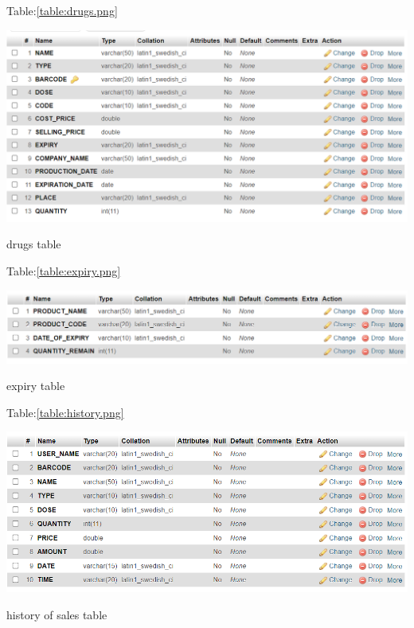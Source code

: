 \documentclass[12pt, letter paper]{report}
\begin{document}
\begin{center}
	Table:\ref{table:drugs.png} 
	\begin{table}[h]
		\centering
		\includegraphics[width=1\textwidth]{drugs.png}
		\caption{drugs table}
		\label{table:drugs.png}
	\end{table}
\end{center}

\begin{center}
	Table:\ref{table:expiry.png}
	\begin{table}[h]
		\centering
		\includegraphics[width=1\textwidth]{expiry.png}
		\caption{expiry table}
		\label{table:expiry.png}
	\end{table}
\end{center}
\newpage
\begin{center}
	Table:\ref{table:history.png}
	\begin{table}[h]
		\centering
		\includegraphics[width=1\textwidth]{history.png}
		\caption{history of sales table}
		\label{table:history.png}
	\end{table}
\end{center}
\end{document}
